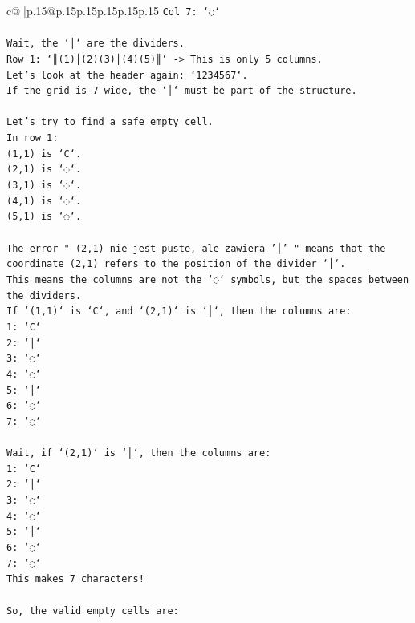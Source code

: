 \documentclass{article}
\begin{document}
{\begin{supertabular}{c@{$\;$}|p{.15\linewidth}@{}p{.15\linewidth}p{.15\linewidth}p{.15\linewidth}p{.15\linewidth}p{.15\linewidth}}
{{{\texttt{Col 7: `◌`} \\
\\ 
\texttt{Wait, the `│` are the dividers.} \\
\texttt{Row 1: `║(1)│(2)(3)│(4)(5)║` {-}> This is only 5 columns.} \\
\texttt{Let's look at the header again: `1234567`.} \\
\texttt{If the grid is 7 wide, the `│` must be part of the structure.} \\
\\ 
\texttt{Let's try to find a safe empty cell.} \\
\texttt{In row 1:} \\
\texttt{(1,1) is `C`.} \\
\texttt{(2,1) is `◌`.} \\
\texttt{(3,1) is `◌`.} \\
\texttt{(4,1) is `◌`.} \\
\texttt{(5,1) is `◌`.} \\
\\ 
\texttt{The error " (2,1) nie jest puste, ale zawiera '│' " means that the coordinate (2,1) refers to the position of the divider `│`.} \\
\texttt{This means the columns are not the `◌` symbols, but the spaces between the dividers.} \\
\texttt{If `(1,1)` is `C`, and `(2,1)` is `│`, then the columns are:} \\
\texttt{1: `C`} \\
\texttt{2: `│`} \\
\texttt{3: `◌`} \\
\texttt{4: `◌`} \\
\texttt{5: `│`} \\
\texttt{6: `◌`} \\
\texttt{7: `◌`} \\
\\ 
\texttt{Wait, if `(2,1)` is `│`, then the columns are:} \\
\texttt{1: `C`} \\
\texttt{2: `│`} \\
\texttt{3: `◌`} \\
\texttt{4: `◌`} \\
\texttt{5: `│`} \\
\texttt{6: `◌`} \\
\texttt{7: `◌`} \\
\texttt{This makes 7 characters!} \\
\\ 
\texttt{So, the valid empty cells are:} \\
}}}
\end{supertabular}}
\end{document}
